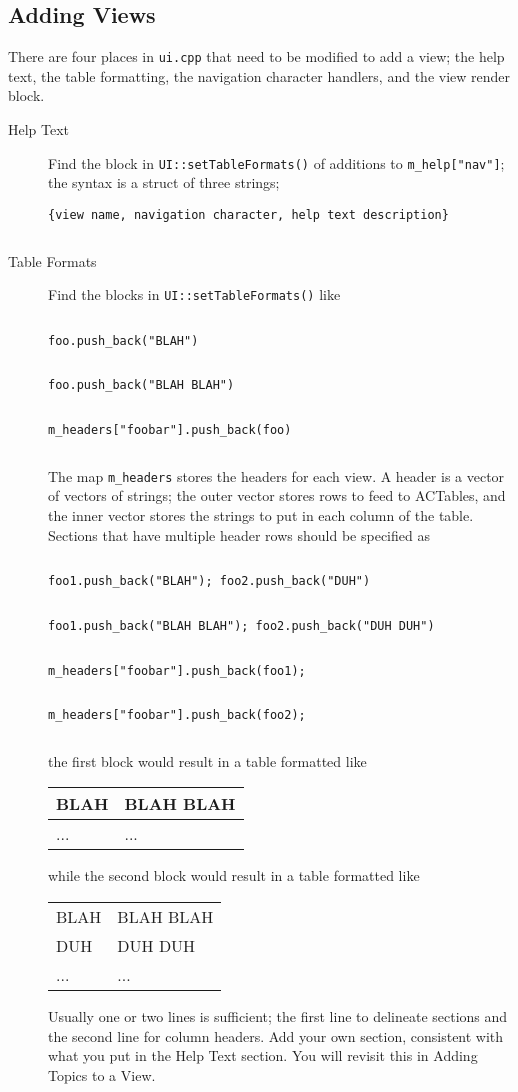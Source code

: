 \documentclass[11pt]{article}
\newcommand{\cmdline}[1]{\vspace{.2em} $\:$\\ \begin{minipage}{\dimexpr\textwidth-2cm}
\texttt{#1}
\end{minipage} $\:$\\ \vspace{-.2em} }
\begin{document}
\subsection{Adding Views}
There are four places in \texttt{ui.cpp} that need to be modified to add a view; the help text, the table formatting, the navigation character handlers, and the view render block.
\begin{description}
\item[Help Text] Find the block in \texttt{UI::setTableFormats()} of additions to \texttt{m\_help["nav"]}; the syntax is a struct of three strings; 
\cmdline{\{view name, navigation character, help text description\}}
\item[Table Formats] Find the blocks in \texttt{UI::setTableFormats()} like

\cmdline{foo.push\_back("BLAH")}
\cmdline{foo.push\_back("BLAH BLAH")}
\cmdline{m\_headers["foobar"].push\_back(foo)}

The map \texttt{m\_headers} stores the headers for each view. A header is a vector of vectors of strings; the outer vector stores rows to feed to ACTables, and the inner vector stores the strings to put in each column of the table. Sections that have multiple header rows should be specified as

\cmdline{foo1.push\_back("BLAH"); foo2.push\_back("DUH")}
\cmdline{foo1.push\_back("BLAH BLAH"); foo2.push\_back("DUH DUH")}
\cmdline{m\_headers["foobar"].push\_back(foo1);}
\cmdline{m\_headers["foobar"].push\_back(foo2);}

the first block would result in a table formatted like

\begin{tabular}{l|l}
BLAH & BLAH BLAH\\
\hline
...&...\\
\end{tabular}

while the second block would result in a table formatted like

\begin{tabular}{l|l}
BLAH & BLAH BLAH\\
DUH & DUH DUH\\
\hline
...&...\\
\end{tabular}

Usually one or two lines is sufficient; the first line to delineate sections and the second line for column headers. Add your own section, consistent with what you put in the Help Text section. You will revisit this in Adding Topics to a View.


\end{description}
\end{document}
